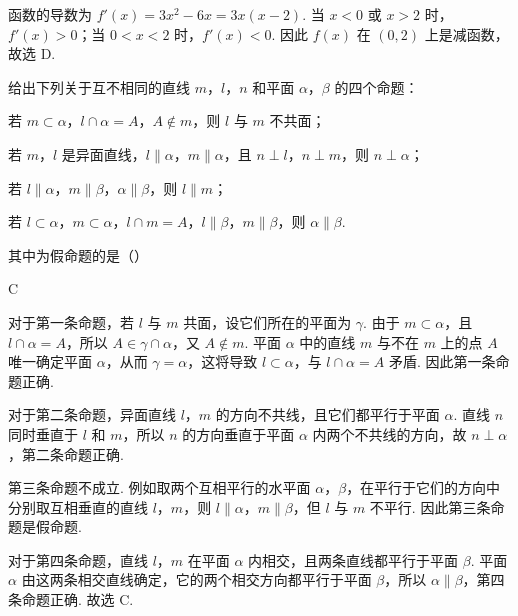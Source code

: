 \begin{solution}
函数的导数为 \(f'(x)=3x^2-6x=3x(x-2)\). 当 \(x<0\) 或 \(x>2\) 时，\(f'(x)>0\)；当 \(0<x<2\) 时，\(f'(x)<0\). 因此 \(f(x)\) 在 \((0,2)\) 上是减函数，故选 D.
\end{solution}

\begin{problem}
给出下列关于互不相同的直线 \(m\)，\(l\)，\(n\) 和平面 \(\alpha\)，\(\beta\) 的四个命题：

\begin{circlelist}
\item 若 \(m \subset \alpha\)，\(l \cap \alpha = A\)，\(A \notin m\)，则 \(l\) 与 \(m\) 不共面；
\item 若 \(m\)，\(l\) 是异面直线，\(l \parallel \alpha\)，\(m \parallel \alpha\)，且 \(n \perp l\)，\(n \perp m\)，则 \(n \perp \alpha\)；
\item 若 \(l \parallel \alpha\)，\(m \parallel \beta\)，\(\alpha \parallel \beta\)，则 \(l \parallel m\)；
\item 若 \(l \subset \alpha\)，\(m \subset \alpha\)，\(l \cap m = A\)，\(l \parallel \beta\)，\(m \parallel \beta\)，则 \(\alpha \parallel \beta\).
\end{circlelist}
其中为假命题的是（\quad）

\choices
    {}
    {}
    {}
    {}
\end{problem}

\begin{answer}
C
\end{answer}

\begin{solution}
对于第一条命题，若 \(l\) 与 \(m\) 共面，设它们所在的平面为 \(\gamma\). 由于 \(m\subset\alpha\)，且 \(l\cap\alpha=A\)，所以 \(A\in\gamma\cap\alpha\)，又 \(A\notin m\). 平面 \(\alpha\) 中的直线 \(m\) 与不在 \(m\) 上的点 \(A\) 唯一确定平面 \(\alpha\)，从而 \(\gamma=\alpha\)，这将导致 \(l\subset\alpha\)，与 \(l\cap\alpha=A\) 矛盾. 因此第一条命题正确.

对于第二条命题，异面直线 \(l\)，\(m\) 的方向不共线，且它们都平行于平面 \(\alpha\). 直线 \(n\) 同时垂直于 \(l\) 和 \(m\)，所以 \(n\) 的方向垂直于平面 \(\alpha\) 内两个不共线的方向，故 \(n\perp\alpha\)，第二条命题正确.

第三条命题不成立. 例如取两个互相平行的水平面 \(\alpha\)，\(\beta\)，在平行于它们的方向中分别取互相垂直的直线 \(l\)，\(m\)，则 \(l\parallel\alpha\)，\(m\parallel\beta\)，但 \(l\) 与 \(m\) 不平行. 因此第三条命题是假命题.

对于第四条命题，直线 \(l\)，\(m\) 在平面 \(\alpha\) 内相交，且两条直线都平行于平面 \(\beta\). 平面 \(\alpha\) 由这两条相交直线确定，它的两个相交方向都平行于平面 \(\beta\)，所以 \(\alpha\parallel\beta\)，第四条命题正确. 故选 C.
\end{solution}


